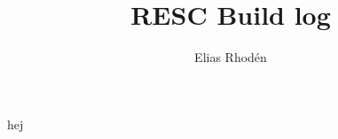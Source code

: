 \documentclass{article}
\title{RESC Build log}
\author{Elias Rhodén}
\begin{document}
\maketitle

hej
\end{document}
